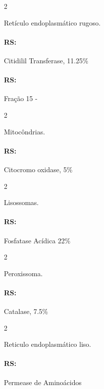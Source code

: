 \documentclass[\mainfilename]{subfiles}
\begin{document}
\begin{multicols}{2}

    \begin{questionBox}2{} %
        
        Retículo endoplasmático rugoso.
        
        \paragraph*{RS:} Citidilil Transferase, 11.25\%
        \paragraph*{RS:} Fração 15 - 
        
    \end{questionBox}
    
    \begin{questionBox}2{} %
        
        Mitocôndrias.

        \paragraph{RS:} Citocromo oxidase, 5\%
        
    \end{questionBox}
    
    
    \begin{questionBox}2{} %
        
        Lisossomas.

        \paragraph*{RS:} Fosfatase Acídica 22\%

        
    \end{questionBox}
    
    \begin{questionBox}2{} %
        
        Peroxissoma.

        \paragraph{RS:} Catalase, 7.5\%
        
    \end{questionBox}
    
    \begin{questionBox}2{} %
        
        Reticulo endoplasmático liso.

        \paragraph*{RS:} Permease de Aminoácidos
        
    \end{questionBox}

\end{multicols}
\end{document}
